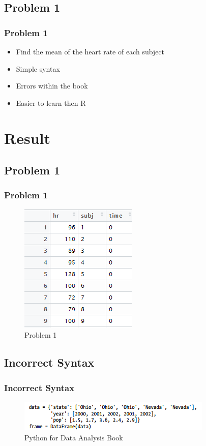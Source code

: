 \documentclass{beamer}
\begin{document}
\subsection{Problem 1}

\begin{frame}
\frametitle{Problem 1}
\begin{itemize}
\setlength\itemsep{3em}
\item Find the mean of the heart rate of each subject
\item Simple syntax
\item Errors within the book
\item Easier to learn then R
\end{itemize}
\end{frame}

\section{Result}
\subsection{Problem 1}

\begin{frame}
\frametitle{Problem 1 }
\begin{figure}
\includegraphics[scale=0.7]{heartratedata.png}
\caption{\label{fig:your-figure}Problem 1} 
\end{figure} 
\end{frame}


\subsection{Incorrect Syntax}

\begin{frame}
\frametitle{Incorrect Syntax}
\begin{figure}
\includegraphics[scale=0.9]{dataframe.png}
\caption{\label{fig:your-figure}Python for Data Analysis Book} 
\end{figure} 
\end{frame}
\end{document}
